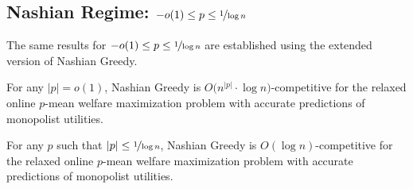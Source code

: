\documentclass[11pt,letterpaper]{article}
\begin{document}
\subsection{Nashian Regime: $-o(1)\leq p\leq \nicefrac{1}{\log n}$}

The same results for $-o(1)\leq p\leq \nicefrac{1}{\log n}$ are established using the extended version of Nashian Greedy.

\begin{theorem}
	\label{thm:nashian-app}
	For any $|p| = o(1)$, Nashian Greedy is $O \big( n^{|p|} \cdot \log n \big)$-competitive for the relaxed online $p$-mean welfare maximization problem with accurate predictions of monopolist utilities.
\end{theorem}

\begin{corollary}
	\label{cor:nashian-app}	
	For any $p$ such that $|p| \le \nicefrac{1}{\log n}$, Nashian Greedy is $O(\log n)$-competitive for the relaxed online $p$-mean welfare maximization problem with accurate predictions of monopolist utilities.
\end{corollary}
\end{document}
